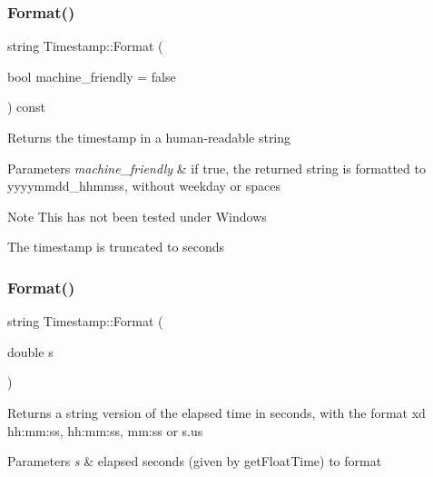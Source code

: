 \subsubsection{\texorpdfstring{Format()}{Format()}\hspace{0.1cm}{\footnotesize\ttfamily [1/2]}}
{\footnotesize\ttfamily string Timestamp\+::\+Format (\begin{DoxyParamCaption}\item[{bool}]{machine\+\_\+friendly = {\ttfamily false} }\end{DoxyParamCaption}) const}

Returns the timestamp in a human-\/readable string 
\begin{DoxyParams}{Parameters}
{\em machine\+\_\+friendly} & if true, the returned string is formatted to yyyymmdd\+\_\+hhmmss, without weekday or spaces \\
\hline
\end{DoxyParams}
\begin{DoxyNote}{Note}
This has not been tested under Windows 

The timestamp is truncated to seconds 
\end{DoxyNote}
\mbox{\label{classDUtils_1_1Timestamp_abd63d0a2abc2209f9300296ee3e85265}} 
\subsubsection{\texorpdfstring{Format()}{Format()}\hspace{0.1cm}{\footnotesize\ttfamily [2/2]}}
{\footnotesize\ttfamily string Timestamp\+::\+Format (\begin{DoxyParamCaption}\item[{double}]{s }\end{DoxyParamCaption})\hspace{0.3cm}{\ttfamily [static]}}

Returns a string version of the elapsed time in seconds, with the format xd hh\+:mm\+:ss, hh\+:mm\+:ss, mm\+:ss or s.\+us 
\begin{DoxyParams}{Parameters}
{\em s} & elapsed seconds (given by get\+Float\+Time) to format \\
\hline
\end{DoxyParams}
\mbox{\label{classDUtils_1_1Timestamp_a360ea9b3a339c315f1a1eb2416787088}} 
